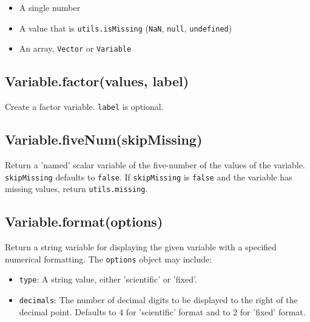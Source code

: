 \documentclass{article}
\begin{document}
\begin{itemize}

\item A single number

\item A value that is \texttt{utils.isMissing}  (\texttt{NaN}, \texttt{null}, \texttt{undefined})

\item An array, \texttt{Vector} or \texttt{Variable}

\end{itemize}

    \subsection*{Variable.factor(values, label)}
    Create a factor variable. \texttt{label} is optional.


    \subsection*{Variable.fiveNum(skipMissing)}
    Return a 'named' scalar variable of the five-number of the values of the variable.
\texttt{skipMissing} defaults to \texttt{false}.  If \texttt{skipMissing} is \texttt{false} and
the variable has missing values, return \texttt{utils.missing}.


    \subsection*{Variable.format(options)}
    Return a string variable for displaying the given variable with a
specified numerical formatting. The \texttt{options} object may include:


\begin{itemize}

\item \texttt{type}: A string value, either 'scientific' or 'fixed'.

\item \texttt{decimals}: The number of decimal digits to be displayed to the right of
the decimal point. Defaults to 4 for 'scientific' format and to 2 for 'fixed'
format.

\end{itemize}
\end{document}
